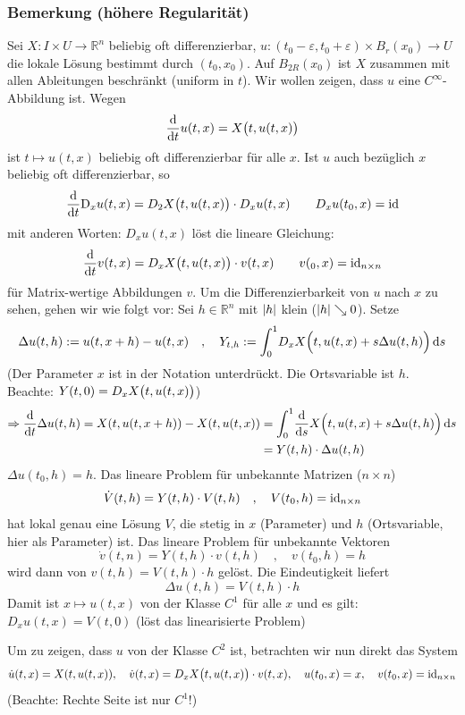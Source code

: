 \subsubsection{Bemerkung (höhere Regularität)} %
\label{ssub:233}
Sei $X : I  \times U \to \mathds{R}^n$ beliebig oft differenzierbar, $u : (t_0 - \varepsilon, t_0 + \varepsilon)  \times B_r(x_0) \to U$ die lokale Lösung bestimmt durch
$(t_0, x_0)$. Auf $B_{2R}(x_0)$ ist $X$ zusammen mit allen Ableitungen beschränkt (uniform in $t$). Wir wollen zeigen, dass $u$ eine $C^\infty$-Abbildung ist. Wegen 
\[
	\diffd{}{t} u(t,x) = X \enbrace[\big]{t, u(t,x)} 
\]
ist $t \mapsto u(t,x)$ beliebig oft differenzierbar für alle $x$. Ist $u$ auch bezüglich $x$ beliebig oft differenzierbar, so 
\[
	\diffd{}{t} \mathrm{D}_x u(t,x) = D_2 X \enbrace[\big]{t, u(t,x)}  \cdot D_x u(t,x) \qquad D_x u(t_0,x) = \id
\]
mit anderen Worten: $D_x u(t,x)$ löst die lineare Gleichung:
\[
	\diffd{}{t} v(t,x) = D_x X\enbrace[\big]{t, u(t,x) } \cdot v(t,x) \qquad v(_0, x) = \id_{n \times n}
\] 
für Matrix-wertige Abbildungen $v$. Um die Differenzierbarkeit von $u$ nach $x$ zu sehen, gehen wir wie folgt vor: Sei $h \in \mathds{R}^n$ mit $\abs*{h}$ klein
($\abs*{h} \searrow 0$). Setze
\[
	\Delta u(t,h) := u(t, x+h) - u(t,x) \quad , \quad Y_{t,h} := \int_0^1 \! D_x X\enbrace[\Big]{t, u(t,x) + s \Delta u(t,h)}  \, \mathrm{d}s
\]
(Der Parameter $x$ ist in der Notation unterdrückt. Die Ortsvariable ist $h$. Beachte: $Y(t,0) = D_x X \enbrace[\big]{t, u(t,x)} $)
\begin{align*}
	\Rightarrow  \diffd{}{t} \Delta u(t,h) = X (t,u(t,x+h)) - X(t, u(t,x)) &= \int_{0} ^{1} \! \diffd{}{s} X\enbrace[\Big]{t,u(t,x) + s \Delta u(t,h)}  \, \mathrm{d}s\\
	&= Y(t,h) \cdot \Delta u(t,h)
\end{align*}
$\Delta u(t_0,h) = h$. Das lineare Problem für unbekannte Matrizen ($n \times n$)
\[
	\dot V (t,h) = Y(t,h) \cdot V(t,h) \quad , \quad V(t_0,h) = \id_{n \times n}
\]
hat lokal genau eine Lösung $V$, die stetig in $x$ (Parameter) und $h$ (Ortsvariable, hier als Parameter) ist. Das lineare Problem für
unbekannte Vektoren 
\[
	\dot v(t,n) = Y(t,h) \cdot v(t,h) \quad , \quad v(t_0,h) = h
\]
wird dann von $v(t,h)= V(t,h) \cdot h$ gelöst. Die Eindeutigkeit liefert
\[
	\Delta u(t,h) = V(t,h) \cdot h
\]
Damit ist $x  \mapsto u(t,x)$ von der Klasse $C^1$ für alle $x$ und es gilt: 
\(
	D_x u(t,x) = V(t,0)
\) (löst das linearisierte Problem)

Um zu zeigen, dass $u$ von der Klasse $C^2$ ist, betrachten wir nun direkt das System 
\[
	\dot u(t,x) = X(t, u(t,x))  , \quad \dot v (t,x) = D_x X\enbrace[\big]{t, u(t,x)} \cdot v(t,x) , \quad u(t_0, x) = x , \quad v(t_0, x) = \id_{n \times n}
\]
(Beachte: Rechte Seite ist nur $C^1$!)

